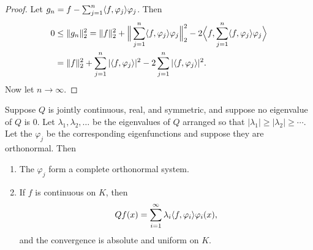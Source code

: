 \begin{proof}
Let $g_n = f - \sum_{j=1}^n \langle f, \varphi_j \rangle\varphi_j$. Then
\begin{align*}
    0 &\leq \|g_n\|_2^2 = \|f\|_2^2 + \Big\|\sum_{j=1}^n \langle f, \varphi_j \rangle\varphi_j\Big\|_2^2 - 2\Big\langle f, \sum_{j=1}^n \langle f, \varphi_j \rangle\varphi_j\Big\rangle \\
    &= \|f\|_2^2 + \sum_{j=1}^n |\langle f, \varphi_j \rangle|^2 - 2\sum_{j=1}^n |\langle f, \varphi_j \rangle|^2.
\end{align*}
Now let $n \to \infty$.
\end{proof}


\begin{theorem}\label{thm:ch2_4.12}
Suppose $Q$ is jointly continuous, real, and symmetric, and suppose no eigenvalue of $Q$ is $0$. Let $\lambda_1, \lambda_2,\ldots$ be the eigenvalues of $Q$ arranged so that $|\lambda_1| \geq |\lambda_2| \geq \cdots$. Let the $\varphi_j$ be the corresponding eigenfunctions and suppose they are orthonormal.
Then
\begin{enumerate}
    \item The $\varphi_j$ form a complete orthonormal system.
    \item If $f$ is continuous on $K$, then
    \[
        Qf(x)= \sum_{i=1}^{\infty} \lambda_i\langle f, \varphi_i \rangle\varphi_i(x),
    \]
    and the convergence is absolute and uniform on $K$.
\end{enumerate}
\end{theorem}

